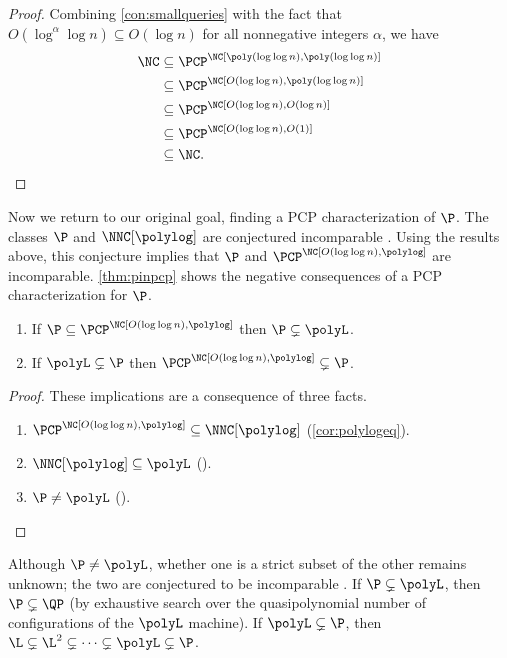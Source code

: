 \begin{proof}
  Combining \autoref{con:smallqueries} with the fact that $O(\log^\alpha \log n) \subseteq O(\log n)$ for all nonnegative integers $\alpha$, we have
  \begin{align*}
    \NC & \subseteq \PCP^\NC[\poly(\loglog n), \poly(\loglog n)] \\
    & \subseteq \PCP^\NC[O(\loglog n), \poly(\loglog n)] \\
    & \subseteq \PCP^\NC[O(\loglog n), O(\log n)] \\
    & \subseteq \PCP^\NC[O(\loglog n), O(1)] \\
    & \subseteq \NC.
    \qedhere
  \end{align*}
\end{proof}

Now we return to our original goal, finding a PCP characterization of $\P$.
The classes $\P$ and $\NNC[\polylog]$ are conjectured incomparable \autocite{wolf94}.
Using the results above, this conjecture implies that $\P$ and $\PCP^\NC[O(\loglog n), \polylog]$ are incomparable.
\autoref{thm:pinpcp} shows the negative consequences of a PCP characterization for $\P$.

\begin{theorem}\label{thm:pinpcp}
  \mbox{}
  \begin{enumerate}
  \item If $\P \subseteq \PCP^\NC[O(\loglog n), \polylog]$ then $\P \subsetneq \polyL$.
  \item If $\polyL \subsetneq \P$ then $\PCP^\NC[O(\loglog n), \polylog] \subsetneq \P$.
  \end{enumerate}
\end{theorem}
\begin{proof}
  These implications are a consequence of three facts.
  \begin{enumerate}
  \item $\PCP^\NC[O(\loglog n), \polylog] \subseteq \NNC[\polylog]$ (\autoref{cor:polylogeq}).
  \item $\NNC[\polylog] \subseteq \polyL$ (\autocite[Corollary~3.2]{wolf94}).
  \item $\P \neq \polyL$ (\autocite[Theorem~3.10]{book76}). \qedhere
  \end{enumerate}
\end{proof}

Although $\P \neq \polyL$, whether one is a strict subset of the other remains unknown; the two are conjectured to be incomparable \autocite[Section~2.5.1]{johnson90}.
If $\P \subsetneq \polyL$, then $\P \subsetneq \QP$ (by exhaustive search over the quasipolynomial number of configurations of the $\polyL$ machine).
If $\polyL \subsetneq \P$, then $\L \subsetneq \L^2 \subsetneq \dotsb \subsetneq \polyL \subsetneq \P$.

